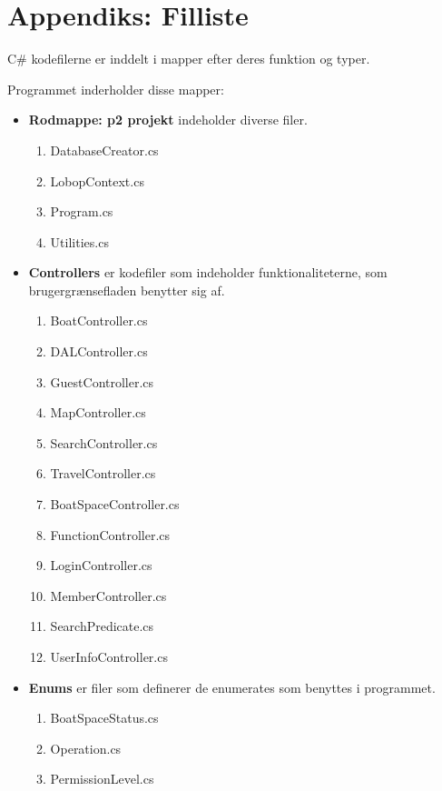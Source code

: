 \chapter{Appendiks: Filliste}
\label{cha:filliste}

C\# kodefilerne er inddelt i mapper efter deres funktion og typer.

Programmet inderholder disse mapper:

\begin{itemize}
	\item \textbf{Rodmappe: p2 projekt} indeholder diverse filer.
		\begin{enumerate}
			\item DatabaseCreator.cs
			\item LobopContext.cs
			\item Program.cs
			\item Utilities.cs
		\end{enumerate}	
\end{itemize}

\begin{itemize}
	\item \textbf{Controllers} er kodefiler som indeholder funktionaliteterne, som brugergrænsefladen benytter sig af. 
		\begin{enumerate}
			\item BoatController.cs
			\item DALController.cs
			\item GuestController.cs
			\item MapController.cs
			\item SearchController.cs
			\item TravelController.cs
			\item BoatSpaceController.cs
			\item FunctionController.cs
			\item LoginController.cs
			\item MemberController.cs
			\item SearchPredicate.cs
			\item UserInfoController.cs
		\end{enumerate}	
\end{itemize}

\begin{itemize}
	\item \textbf{Enums} er filer som definerer de enumerates som benyttes i programmet.
		\begin{enumerate}
			\item BoatSpaceStatus.cs
			\item Operation.cs
			\item PermissionLevel.cs
		\end{enumerate}
\end{itemize}

